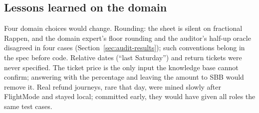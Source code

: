 
\subsection{Lessons learned on the domain}

Four domain choices would change. Rounding: the sheet is silent on fractional Rappen, and the domain expert's floor rounding and the auditor's half-up oracle disagreed in four cases (Section~\ref{sec:audit-results}); such conventions belong in the spec before code. Relative dates (``last Saturday'') and return tickets were never specified. The ticket price is the only input the knowledge base cannot confirm; answering with the percentage and leaving the amount to SBB would remove it. Real refund journeys, rare that day, were mined slowly after FlightMode and stayed local; committed early, they would have given all roles the same test cases.
